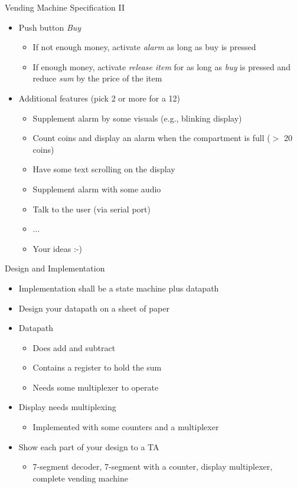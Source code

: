 \begin{frame}[fragile]{Vending Machine Specification II}
\begin{itemize}
\item Push button \emph{Buy}
\begin{itemize}
\item If not enough money, activate \emph{alarm} as long as buy is pressed
\item If enough money, activate \emph{release item} for as long as \emph{buy}
is pressed and reduce \emph{sum} by the price of the item
\end{itemize}
\item Additional features (pick 2 or more for a 12)
\begin{itemize}
\item Supplement alarm by some visuals (e.g., blinking display)
\item Count coins and display an alarm when the compartment is full ($>$ 20 coins)
\item Have some text scrolling on the display
\item Supplement alarm with some audio
\item Talk to the user (via serial port)
\item ...
\item Your ideas :-)
\end{itemize}
\end{itemize}
\end{frame}

\begin{frame}[fragile]{Design and Implementation}
\begin{itemize}
\item Implementation shall be a state machine plus datapath
\item Design your datapath on a sheet of paper
\item Datapath
\begin{itemize}
\item Does add and subtract
\item Contains a register to hold the sum
\item Needs some multiplexer to operate
\end{itemize}
\item Display needs multiplexing
\begin{itemize}
\item Implemented with some counters and a multiplexer
\end{itemize}
\item Show each part of your design to a TA
\begin{itemize}
\item 7-segment decoder, 7-segment with a counter, display multiplexer, complete vending machine
\end{itemize}
\end{itemize}
\end{frame}

